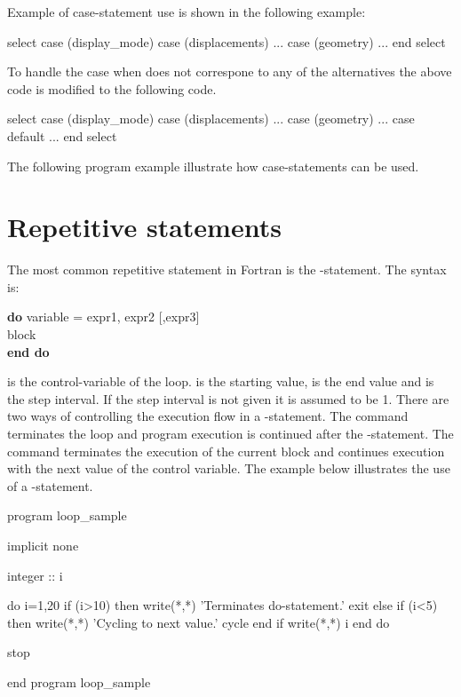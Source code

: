 Example of case-statement use is shown in the following example:

\begin{fortrancodeenv}
select case (display_mode)
    case (displacements)
        ...
    case (geometry)
        ...
end select
\end{fortrancodeenv}

To handle the case when  does not correspone to any of the alternatives the above code is modified to the following code.

\begin{fortrancodeenv}
select case (display_mode) case (displacements)
        ...
    case (geometry)
        ...
    case default
        ...
end select
\end{fortrancodeenv}

The following program example illustrate how case-statements can be used.


\section{Repetitive statements}

The most common repetitive statement in Fortran is the -statement. The syntax is:

\begin{fsyntax}
\textbf{do} variable = expr1, expr2 [,expr3]\\
\ftab block\\
\textbf{end do}
\end{fsyntax}

 is the control-variable of the loop.  is the starting value,  is the end value and  is the step interval. If the step interval is not given it is assumed to be 1. There are two ways of controlling the execution flow in a -statement. The  command terminates the loop and program execution is continued after the -statement. The  command terminates the execution of the current block and continues execution with the next value of the control variable. The example below illustrates the use of a -statement.

\begin{fortrancodeenv}
program loop_sample

    implicit none

    integer :: i

    do i=1,20
        if (i>10) then
            write(*,*) 'Terminates do-statement.'
            exit
        else if (i<5) then
            write(*,*) 'Cycling to next value.'
            cycle
        end if
        write(*,*) i
    end do

    stop

end program loop_sample
\end{fortrancodeenv}

